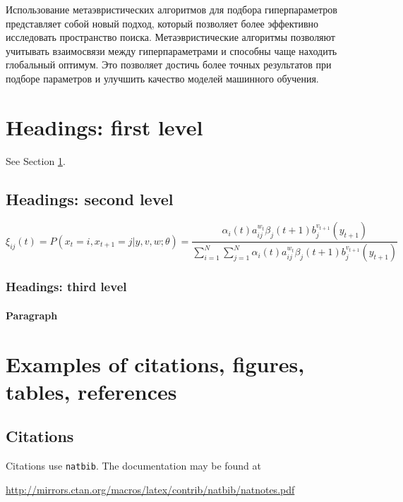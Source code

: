 \documentclass{article}
\begin{document}
Использование метаэвристических алгоритмов для подбора гиперпараметров представляет собой новый подход, который позволяет более эффективно исследовать пространство поиска. Метаэвристические алгоритмы позволяют учитывать взаимосвязи между гиперпараметрами и способны чаще находить глобальный оптимум. Это позволяет достичь более точных результатов при подборе параметров и улучшить качество моделей машинного обучения.

\section{Headings: first level}
\label{sec:headings}

\lipsum[4] See Section \ref{sec:headings}.

\subsection{Headings: second level}
\lipsum[5]
\begin{equation}
	\xi _{ij}(t)=P(x_{t}=i,x_{t+1}=j|y,v,w;\theta)= {\frac {\alpha _{i}(t)a^{w_t}_{ij}\beta _{j}(t+1)b^{v_{t+1}}_{j}(y_{t+1})}{\sum _{i=1}^{N} \sum _{j=1}^{N} \alpha _{i}(t)a^{w_t}_{ij}\beta _{j}(t+1)b^{v_{t+1}}_{j}(y_{t+1})}}
\end{equation}

\subsubsection{Headings: third level}
\lipsum[6]

\paragraph{Paragraph}
\lipsum[7]



\section{Examples of citations, figures, tables, references}
\label{sec:others}

\subsection{Citations}
Citations use \verb+natbib+. The documentation may be found at
\begin{center}
	\url{http://mirrors.ctan.org/macros/latex/contrib/natbib/natnotes.pdf}
\end{center}
\end{document}
